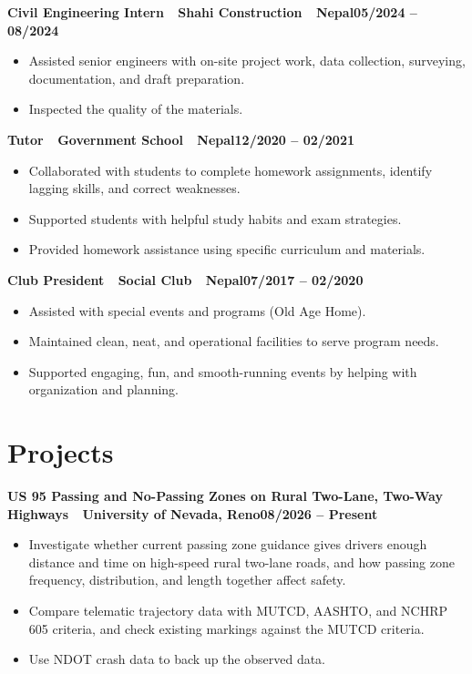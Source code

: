 \documentclass[9pt,letterpaper]{extarticle}
\newcommand{\sep}{\,\textbar\,}
\newcommand{\entry}[2]{\vspace{2pt}\textbf{#1}\hfill\textbf{#2}\par}
\begin{document}
\entry{Civil Engineering Intern \sep{} Shahi Construction \sep{} Nepal}{05/2024 -- 08/2024}
\begin{itemize}
  \item Assisted senior engineers with on-site project work, data collection, surveying, documentation, and draft preparation.
  \item Inspected the quality of the materials.
\end{itemize}

\entry{Tutor \sep{} Government School \sep{} Nepal}{12/2020 -- 02/2021}
\begin{itemize}
  \item Collaborated with students to complete homework assignments, identify lagging skills, and correct weaknesses.
  \item Supported students with helpful study habits and exam strategies.
  \item Provided homework assistance using specific curriculum and materials.
\end{itemize}

\entry{Club President \sep{} Social Club \sep{} Nepal}{07/2017 -- 02/2020}
\begin{itemize}
  \item Assisted with special events and programs (Old Age Home).
  \item Maintained clean, neat, and operational facilities to serve program needs.
  \item Supported engaging, fun, and smooth-running events by helping with organization and planning.
\end{itemize}

\section{Projects}
\entry{US 95 Passing and No-Passing Zones on Rural Two-Lane, Two-Way Highways \sep{} University of Nevada, Reno}{08/2026 -- Present}
\begin{itemize}
  \item Investigate whether current passing zone guidance gives drivers enough distance and time on high-speed rural two-lane roads, and how passing zone frequency, distribution, and length together affect safety.
  \item Compare telematic trajectory data with MUTCD, AASHTO, and NCHRP 605 criteria, and check existing markings against the MUTCD criteria.
  \item Use NDOT crash data to back up the observed data.
\end{itemize}
\end{document}
